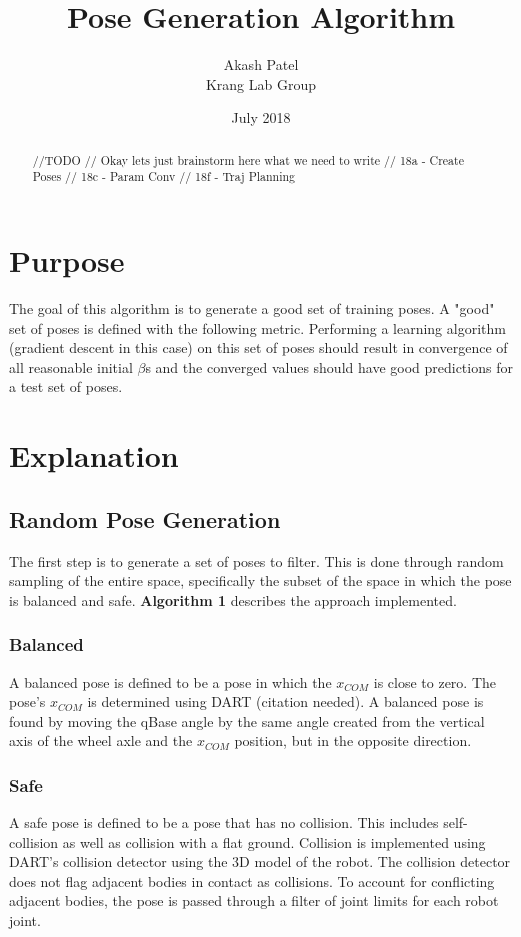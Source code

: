 \documentclass[letterpaper, 10pt, conference]{ieeeconf}
\title{Pose Generation Algorithm}
\author{Akash Patel\\ Krang Lab Group}
\date{July 2018}
\begin{document}
\maketitle
\thispagestyle{empty}
\pagestyle{empty}

\begin{abstract}

//TODO
// Okay lets just brainstorm here what we need to write
// 18a - Create Poses
// 18c - Param Conv
// 18f - Traj Planning

\end{abstract}

\section{Purpose}

The goal of this algorithm is to generate a good set of training poses. A "good"
set of poses is defined with the following metric. Performing a learning
algorithm (gradient descent in this case) on this set of poses should result in
convergence of all reasonable initial $\beta$s and the converged values should
have good predictions for a test set of poses.

\section{Explanation}

\subsection{Random Pose Generation}

The first step is to generate a set of poses to filter. This is done through
random sampling of the entire space, specifically the subset of the space in
which the pose is balanced and safe. \textbf{Algorithm 1} describes the
approach implemented.

\subsubsection{Balanced}
A balanced pose is defined to be a pose in which the $x_{COM}$ is close to
zero. The pose's $x_{COM}$ is determined using DART (citation needed). A
balanced pose is found by moving the qBase angle by the same angle created from the vertical axis of
the wheel axle and the $x_{COM}$ position, but in the opposite direction.

\subsubsection{Safe}
A safe pose is defined to be a pose that has no collision. This includes
self-collision as well as collision with a flat ground. Collision is implemented
using DART's collision detector using the 3D model of the robot. The collision
detector does not flag adjacent bodies in contact as collisions. To account for
conflicting adjacent bodies, the pose is passed through a filter of joint limits
for each robot joint.
\end{document}
